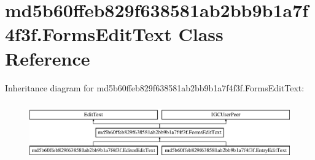 \hypertarget{classmd5b60ffeb829f638581ab2bb9b1a7f4f3f_1_1FormsEditText}{}\section{md5b60ffeb829f638581ab2bb9b1a7f4f3f.\+Forms\+Edit\+Text Class Reference}
\label{classmd5b60ffeb829f638581ab2bb9b1a7f4f3f_1_1FormsEditText}
Inheritance diagram for md5b60ffeb829f638581ab2bb9b1a7f4f3f.\+Forms\+Edit\+Text\+:\begin{figure}[H]
\begin{center}
\leavevmode
\includegraphics[height=2.530120cm]{classmd5b60ffeb829f638581ab2bb9b1a7f4f3f_1_1FormsEditText}
\end{center}
\end{figure}
